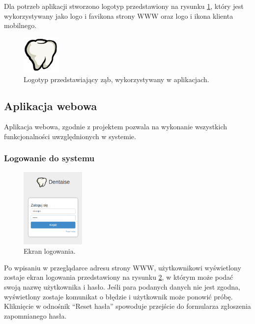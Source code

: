 \documentclass[11pt]{aghdpl}
\begin{document}
Dla potrzeb aplikacji stworzono logotyp przedstawiony na rysunku \ref{fig:logo}, który jest wykorzystywany jako logo i favikona strony WWW oraz logo i ikona klienta mobilnego.

\begin{figure}[h!]
	\centering
	\includegraphics{logo}
	\caption{Logotyp przedstawiający ząb, wykorzystywany w aplikacjach.}
	\label{fig:logo}
\end{figure}

\subsection{Aplikacja webowa}

Aplikacja webowa, zgodnie z projektem pozwala na wykonanie wszystkich funkcjonalności uwzględnionych w systemie.

\subsubsection{Logowanie do systemu}

\begin{figure}
	\begin{center}
		\includegraphics[width=0.28\textwidth]{logowanie}
	\end{center}
	\caption{Ekran logowania.}
	\label{fig:logowanie}
\end{figure}

Po wpisaniu w przeglądarce adresu strony WWW, użytkownikowi wyświetlony zostaje ekran logowania przedstawiony na rysunku \ref{fig:logowanie}, w którym może podać swoją nazwę użytkownika i hasło. Jeśli para podanych danych nie jest zgodna, wyświetlony zostaje komunikat o błędzie i użytkownik może ponowić próbę. Kliknięcie w odnośnik ``Reset hasła'' spowoduje przejście do formularza zgłoszenia zapomnianego hasła.
\end{document}
